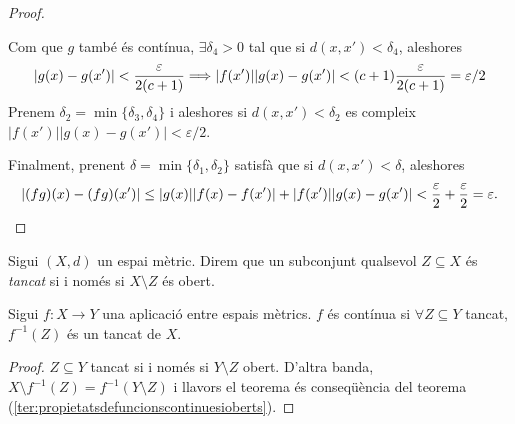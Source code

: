 \documentclass[../main.tex]{subfiles}
\begin{document}
\begin{proof}
\begin{itemize}
    Com que $g$ també és contínua, $\exists \delta_4>0$ tal que si $d(x,x')<\delta_4$, aleshores
    \begin{equation}
        \notag
        |g(x)-g(x')|<\frac{\varepsilon}{2(c+1)} \Longrightarrow |f(x')||g(x)-g(x')|<(c+1)\frac{\varepsilon}{2(c+1)} = \varepsilon/2
    \end{equation}
    Prenem $\delta_2 = \min\{\delta_3,\delta_4\}$ i aleshores si $d(x,x')<\delta_2$ es compleix $|f(x')||g(x)-g(x')|<\varepsilon/2$.
\end{itemize}
Finalment, prenent $\delta = \min\{\delta_1,\delta_2\}$ satisfà que si $d(x,x')<\delta$, aleshores
\begin{equation}
    \notag
    |(fg)(x)-(fg)(x')|\leq|g(x)||f(x)-f(x')|+|f(x')||g(x)-g(x')|<\frac{\varepsilon}{2}+\frac{\varepsilon}{2} = \varepsilon.
\end{equation}
\end{proof}



\begin{defi}
[Tancat]\label{def:tancat} Sigui $(X,d)$ un espai mètric. Direm que un subconjunt qualsevol $Z\subseteq X$ és \textit{tancat} si i només si $X\setminus Z$ és obert.
\end{defi}

\begin{prop}
\label{prop:continuatancat} Sigui $f:X\rightarrow Y$ una aplicació entre espais mètrics. $f$ és contínua si $\forall Z\subseteq Y$ tancat, $f^{-1}(Z)$ és un tancat de $X$.
\end{prop}
\begin{proof}
$Z\subseteq Y$ tancat si i només si $Y\setminus Z$ obert. D'altra banda, $X\setminus f^{-1}(Z) = f^{-1}(Y\setminus Z)$ i llavors el teorema és conseqüència del teorema (\ref{ter:propietatsdefuncionscontinuesioberts}).
\end{proof}
\end{document}
